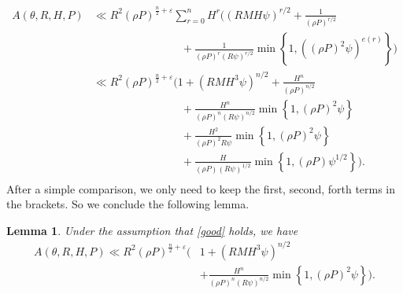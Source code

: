 \documentclass[12pt]{amsart}
\newtheorem{lemma}[theorem]{Lemma}
\theoremstyle{definition}
\numberwithin{equation}{section}
\begin{document}
\begin{equation*}
    \begin{split}
        A(\theta, R, H, P)
        &\ll R^2(\rho P)^{\frac{n}{2}+\varepsilon}\sum_{r=0}^{n}H^r\bigg((RMH\psi)^{r/2}+\frac{1}{(\rho P)^{r/2}}\\
        &\qquad\qquad\qquad\qquad+\frac{1}{(\rho P)^r(R\psi)^{r/2}}\min\left\{1, \left((\rho P)^2\psi\right)^{e(r)}\right\} \bigg)\\
        &\ll R^2(\rho P)^{\frac{n}{2}+\varepsilon}\bigg(1+(RMH^3\psi)^{n/2}+\frac{H^n}{(\rho P)^{n/2}}\\
        &\qquad\qquad\qquad\qquad+\frac{H^n}{(\rho P)^n(R\psi)^{n/2}}\min\left\{1, (\rho P)^2\psi\right\}\\
        &\qquad\qquad\qquad\qquad+\frac{H^2}{(\rho P)^2R\psi}\min\left\{1, (\rho P)^2\psi\right\}\\
        &\qquad\qquad\qquad\qquad+\frac{H}{(\rho P)(R\psi)^{1/2}}\min\left\{1, (\rho P)\psi^{1/2}\right\}\bigg).\\
    \end{split}
\end{equation*}
After a simple comparison, we only need to keep the first, second, forth terms in the brackets. So we conclude the following lemma.
\begin{lemma}
    Under the assumption that \eqref{good} holds, we have
    \begin{equation}
        \begin{split}
            \label{A(theta,R,H,P)_upper_boung_if_good}
            A(\theta, R, H, P)
            \ll R^2(\rho P)^{\frac{n}{2}+\varepsilon}\bigg(&1+(RMH^3\psi)^{n/2}\\
            &+\frac{H^n}{(\rho P)^n(R\psi)^{n/2}}\min\left\{1, (\rho P)^2\psi\right\}\bigg).
        \end{split}
    \end{equation}
\end{lemma}
\end{document}
